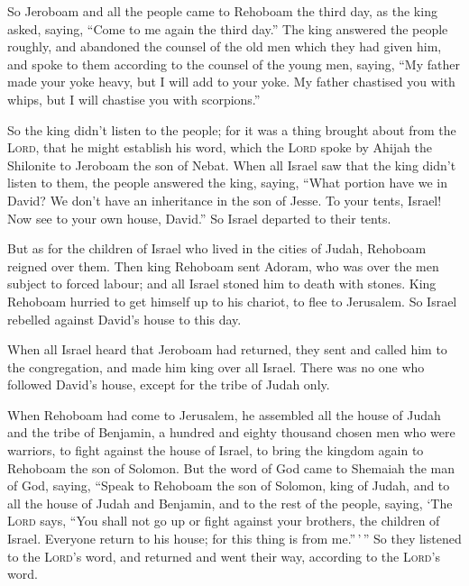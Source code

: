  So Jeroboam and all the people came to Rehoboam the
third day, as the king asked, saying, ``Come to me again the third
day.''  The king answered the people roughly, and
abandoned the counsel of the old men which they had given him,
 and spoke to them according to the counsel of the young
men, saying, ``My father made your yoke heavy, but I will add to your
yoke. My father chastised you with whips, but I will chastise you with
scorpions.''

 So the king didn't listen to the people; for it was a
thing brought about from the \textsc{Lord}, that he might establish his
word, which the \textsc{Lord} spoke by Ahijah the Shilonite to Jeroboam
the son of Nebat.  When all Israel saw that the king
didn't listen to them, the people answered the king, saying, ``What
portion have we in David? We don't have an inheritance in the son of
Jesse. To your tents, Israel! Now see to your own house, David.'' So
Israel departed to their tents.

 But as for the children of Israel who lived in the
cities of Judah, Rehoboam reigned over them.  Then king
Rehoboam sent Adoram, who was over the men subject to forced labour; and
all Israel stoned him to death with stones. King Rehoboam hurried to get
himself up to his chariot, to flee to Jerusalem.  So
Israel rebelled against David's house to this day.

 When all Israel heard that Jeroboam had returned, they
sent and called him to the congregation, and made him king over all
Israel. There was no one who followed David's house, except for the
tribe of Judah only.

 When Rehoboam had come to Jerusalem, he assembled all
the house of Judah and the tribe of Benjamin, a hundred and eighty
thousand chosen men who were warriors, to fight against the house of
Israel, to bring the kingdom again to Rehoboam the son of Solomon.
 But the word of God came to Shemaiah the man of God,
saying,  ``Speak to Rehoboam the son of Solomon, king of
Judah, and to all the house of Judah and Benjamin, and to the rest of
the people, saying,  `The \textsc{Lord} says, ``You shall
not go up or fight against your brothers, the children of Israel.
Everyone return to his house; for this thing is from me.''\,'\,'' So
they listened to the \textsc{Lord}'s word, and returned and went their
way, according to the \textsc{Lord}'s word.

